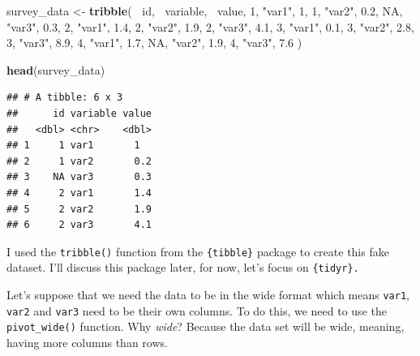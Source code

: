 \documentclass[]{gitbook}
\newenvironment{Shaded}{\begin{snugshade}}{\end{snugshade}}
\newcommand{\DataTypeTok}[1]{\textcolor[rgb]{0.13,0.29,0.53}{#1}}
\newcommand{\DecValTok}[1]{\textcolor[rgb]{0.00,0.00,0.81}{#1}}
\newcommand{\FloatTok}[1]{\textcolor[rgb]{0.00,0.00,0.81}{#1}}
\newcommand{\KeywordTok}[1]{\textcolor[rgb]{0.13,0.29,0.53}{\textbf{#1}}}
\newcommand{\NormalTok}[1]{#1}
\newcommand{\OperatorTok}[1]{\textcolor[rgb]{0.81,0.36,0.00}{\textbf{#1}}}
\newcommand{\OtherTok}[1]{\textcolor[rgb]{0.56,0.35,0.01}{#1}}
\newcommand{\StringTok}[1]{\textcolor[rgb]{0.31,0.60,0.02}{#1}}
\begin{document}
\begin{Shaded}
\begin{Highlighting}[]
\NormalTok{survey_data <-}\StringTok{ }\KeywordTok{tribble}\NormalTok{(}
  \OperatorTok{~}\NormalTok{id, }\OperatorTok{~}\NormalTok{variable, }\OperatorTok{~}\NormalTok{value,}
  \DecValTok{1}\NormalTok{, }\StringTok{"var1"}\NormalTok{, }\DecValTok{1}\NormalTok{,}
  \DecValTok{1}\NormalTok{, }\StringTok{"var2"}\NormalTok{, }\FloatTok{0.2}\NormalTok{,}
  \OtherTok{NA}\NormalTok{, }\StringTok{"var3"}\NormalTok{, }\FloatTok{0.3}\NormalTok{,}
  \DecValTok{2}\NormalTok{, }\StringTok{"var1"}\NormalTok{, }\FloatTok{1.4}\NormalTok{,}
  \DecValTok{2}\NormalTok{, }\StringTok{"var2"}\NormalTok{, }\FloatTok{1.9}\NormalTok{,}
  \DecValTok{2}\NormalTok{, }\StringTok{"var3"}\NormalTok{, }\FloatTok{4.1}\NormalTok{,}
  \DecValTok{3}\NormalTok{, }\StringTok{"var1"}\NormalTok{, }\FloatTok{0.1}\NormalTok{,}
  \DecValTok{3}\NormalTok{, }\StringTok{"var2"}\NormalTok{, }\FloatTok{2.8}\NormalTok{,}
  \DecValTok{3}\NormalTok{, }\StringTok{"var3"}\NormalTok{, }\FloatTok{8.9}\NormalTok{,}
  \DecValTok{4}\NormalTok{, }\StringTok{"var1"}\NormalTok{, }\FloatTok{1.7}\NormalTok{,}
  \OtherTok{NA}\NormalTok{, }\StringTok{"var2"}\NormalTok{, }\FloatTok{1.9}\NormalTok{,}
  \DecValTok{4}\NormalTok{, }\StringTok{"var3"}\NormalTok{, }\FloatTok{7.6}
\NormalTok{)}

\KeywordTok{head}\NormalTok{(survey_data)}
\end{Highlighting}
\end{Shaded}

\begin{verbatim}
## # A tibble: 6 x 3
##      id variable value
##   <dbl> <chr>    <dbl>
## 1     1 var1       1  
## 2     1 var2       0.2
## 3    NA var3       0.3
## 4     2 var1       1.4
## 5     2 var2       1.9
## 6     2 var3       4.1
\end{verbatim}

I used the \texttt{tribble()} function from the \texttt{\{tibble\}} package to create this fake dataset.
I'll discuss this package later, for now, let's focus on \texttt{\{tidyr\}.}

Let's suppose that we need the data to be in the wide format which means \texttt{var1}, \texttt{var2} and \texttt{var3}
need to be their own columns. To do this, we need to use the \texttt{pivot\_wide()} function. Why \emph{wide}?
Because the data set will be wide, meaning, having more columns than rows.

\begin{Shaded}
\end{Shaded}
\end{document}
